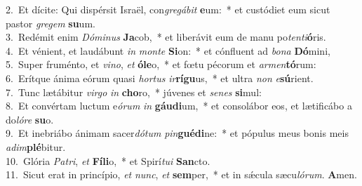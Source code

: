 {2.~}Et dícite: Qui dispérsit Israël, con\textit{gre}\textit{gá}\textit{bit} \textbf{e}um:~* et custódiet eum sicut pastor \textit{gre}\textit{gem} \textbf{su}um.\\
{3.~}Redémit enim \textit{Dó}\textit{mi}\textit{nus} \textbf{Ja}cob,~* et liberávit eum de manu po\textit{ten}\textit{ti}\textbf{ó}ris.\\
{4.~}Et vénient, et laudábunt \textit{in} \textit{mon}\textit{te} \textbf{Si}on:~* et cónfluent ad \textit{bo}\textit{na} \textbf{Dó}mini,\\
{5.~}Super fruménto, et \textit{vi}\textit{no}, \textit{et} \textbf{ó}\textbf{le}o,~* et fœtu pécorum et \textit{ar}\textit{men}\textbf{tó}rum:\\
{6.~}Erítque ánima eórum quasi \textit{hor}\textit{tus} \textit{ir}\textbf{rí}\textbf{gu}us,~* et ultra \textit{non} \textit{e}\textbf{sú}rient.\\
{7.~}Tunc lætábitur \textit{vir}\textit{go} \textit{in} \textbf{cho}ro,~* júvenes et \textit{se}\textit{nes} \textbf{si}mul:\\
{8.~}Et convértam luctum e\textit{ó}\textit{rum} \textit{in} \textbf{gáu}\textbf{di}um,~* et consolábor eos, et lætificábo a do\textit{ló}\textit{re} \textbf{su}o.\\
{9.~}Et inebriábo ánimam sacer\textit{dó}\textit{tum} \textit{pin}\textbf{gué}\textbf{di}ne:~* et pópulus meus bonis meis \textit{a}\textit{dim}\textbf{plé}bitur.\\
{10.~}Glória \textit{Pa}\textit{tri}, \textit{et} \textbf{Fí}\textbf{li}o,~* et Spirí\textit{tu}\textit{i} \textbf{San}cto.\\
{11.~}Sicut erat in princípio, \textit{et} \textit{nunc}, \textit{et} \textbf{sem}per,~* et in sǽcula sæcu\textit{ló}\textit{rum}. \textbf{A}men.\\
